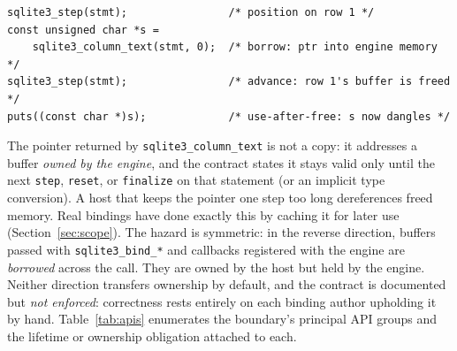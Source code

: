 \documentclass[10pt,twocolumn]{article}
\begin{document}
\begin{lstlisting}
sqlite3_step(stmt);                /* position on row 1 */
const unsigned char *s =
    sqlite3_column_text(stmt, 0);  /* borrow: ptr into engine memory */
sqlite3_step(stmt);                /* advance: row 1's buffer is freed */
puts((const char *)s);             /* use-after-free: s now dangles */
\end{lstlisting}

\noindent The pointer returned by \texttt{sqlite3\_column\_text} is not a copy:
it addresses a buffer \emph{owned by the engine}, and the contract states it
stays valid only until the next \texttt{step}, \texttt{reset}, or
\texttt{finalize} on that statement (or an implicit type conversion). A host
that keeps the pointer one step too long dereferences freed memory. Real
bindings have done exactly this by caching it for later use
(Section~\ref{sec:scope}). The hazard is symmetric: in the reverse direction,
buffers passed with \texttt{sqlite3\_bind\_*} and callbacks registered with the
engine are \emph{borrowed} across the call. They are owned by the host but held
by the engine.
Neither direction transfers ownership by default, and the contract is
documented but \emph{not enforced}: correctness rests entirely on each binding
author upholding it by hand. Table~\ref{tab:apis} enumerates the boundary's
principal API groups and the lifetime or ownership obligation attached to each.
\end{document}
